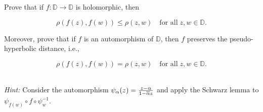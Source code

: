 Prove that if $f:\mathbb{D} \to \mathbb{D}$ is holomorphic, then

$$
\rho(f(z), f(w)) \le \rho(z, w) \quad \text{for all} \; z, w \in \mathbb{D}.
$$

Moreover, prove that if $f$ is an automorphism of $\mathbb{D}$, then $f$ preserves the pseudo-hyperbolic distance, i.e.,

$$
\rho(f(z), f(w)) = \rho(z, w) \quad \text{for all} \; z, w \in \mathbb{D}.
$$

\ \\
\textit{Hint: } Consider the automorphism $\psi_{\alpha}(z) = \frac{z - \alpha}{1 - \overline{\alpha}{z}}$ and apply the 
Schwarz lemma to $\psi_{f(w)} \circ f \circ \psi_{w}^{-1}$.

\begin{solution}
  \ \\
\end{solution}